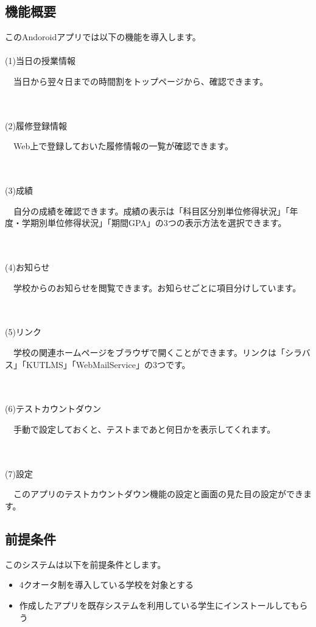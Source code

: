 \subsection{機能概要}
このAndoroidアプリでは以下の機能を導入します。\\ \\
(1)当日の授業情報\\
\hspace{5mm}
\begin{minipage}[h]{145mm}
　当日から翌々日までの時間割をトップページから、確認できます。
\end{minipage}
\\ \\
(2)履修登録情報\\
\hspace{5mm}
\begin{minipage}[h]{145mm}
　Web上で登録しておいた履修情報の一覧が確認できます。
\end{minipage}
\\ \\
(3)成績\\
\hspace{5mm}
\begin{minipage}[h]{145mm}
　自分の成績を確認できます。成績の表示は「科目区分別単位修得状況」「年度・学期別単位修得状況」「期間GPA」の3つの表示方法を選択できます。
\end{minipage}
\\ \\
(4)お知らせ\\
\hspace{5mm}
\begin{minipage}[h]{145mm}
　学校からのお知らせを閲覧できます。お知らせごとに項目分けしています。
\end{minipage}
\\ \\
(5)リンク\\
\hspace{5mm}
\begin{minipage}[h]{145mm}
　学校の関連ホームページをブラウザで開くことができます。リンクは「シラバス」「KUTLMS」「WebMailService」の3つです。
\end{minipage}
\\ \\
(6)テストカウントダウン\\
\hspace{5mm}
\begin{minipage}[h]{145mm}
　手動で設定しておくと、テストまであと何日かを表示してくれます。
\end{minipage}
\\ \\
(7)設定\\
\hspace{5mm}
\begin{minipage}[h]{145mm}
 　このアプリのテストカウントダウン機能の設定と画面の見た目の設定ができます。
\end{minipage}

\subsection{前提条件}
このシステムは以下を前提条件とします。
\begin{itemize}
\item 4クオータ制を導入している学校を対象とする
\item 作成したアプリを既存システムを利用している学生にインストールしてもらう
\end{itemize}
